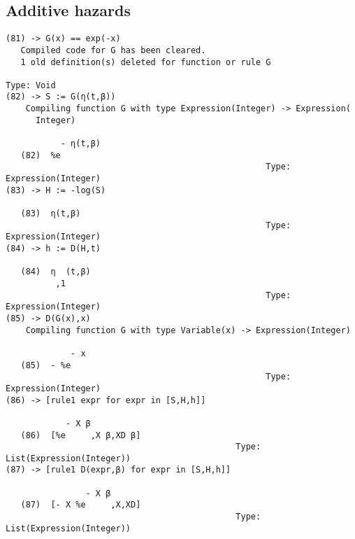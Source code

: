 \documentclass[11pt]{article}
\begin{document}
\subsection{Additive hazards}
\label{sec:orgheadline5}


\begin{verbatim}
(81) -> G(x) == exp(-x)
   Compiled code for G has been cleared.
   1 old definition(s) deleted for function or rule G 
                                                                   Type: Void
(82) -> S := G(η(t,β))
    Compiling function G with type Expression(Integer) -> Expression(
      Integer) 

           - η(t,β)
   (82)  %e
                                                    Type: Expression(Integer)
(83) -> H := -log(S)
 
   (83)  η(t,β)
                                                    Type: Expression(Integer)
(84) -> h := D(H,t)
 
   (84)  η  (t,β)
          ,1
                                                    Type: Expression(Integer)
(85) -> D(G(x),x)
    Compiling function G with type Variable(x) -> Expression(Integer) 

             - x
   (85)  - %e
                                                    Type: Expression(Integer)
(86) -> [rule1 expr for expr in [S,H,h]]
 
            - X β
   (86)  [%e     ,X β,XD β]
                                              Type: List(Expression(Integer))
(87) -> [rule1 D(expr,β) for expr in [S,H,h]]
 
                - X β
   (87)  [- X %e     ,X,XD]
                                              Type: List(Expression(Integer))
\end{verbatim}
\end{document}
